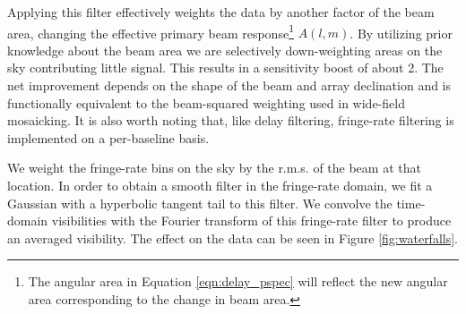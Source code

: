 \documentclass[twocolumn,numberedappendix]{emulateapj} \shorttitle{New Limits on the 21 cm Power Spectrum at $z=8.4$}
\begin{document}
Applying this filter effectively weights the data by another factor of the beam
area, changing the effective primary beam response\footnote{The
angular area in Equation \eqref{eqn:delay_pspec} will reflect the new angular area
corresponding to the change in beam area.} $A(l,m)$\citep{parsons_et_al2015}. By
utilizing prior knowledge about the beam area we are selectively down-weighting
areas on the sky contributing little signal. This results in a sensitivity boost of
about 2.  The net improvement depends on the shape of the beam and array
declination and is functionally equivalent to the beam-squared weighting used in
wide-field mosaicking. It is also worth noting that, like delay 
filtering, fringe-rate filtering is implemented on a per-baseline basis.

 We weight
the fringe-rate bins on the sky by the r.m.s. of the beam at that location.
In order to obtain a smooth filter in the fringe-rate domain, we fit a
Gaussian with a hyperbolic tangent tail to this filter. We convolve the time-domain visibilities with the Fourier transform of this fringe-rate filter to
produce an averaged visibility.  The effect on the data can be seen
in Figure \ref{fig:waterfalls}.

\end{document}
